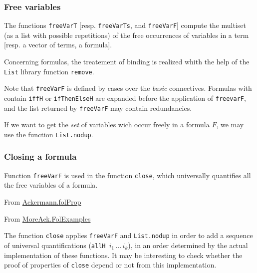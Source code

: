 \subsubsection{Free variables}
The functions \texttt{freeVarT} [resp. \texttt{freeVarTs},  and
\texttt{freeVarF}] compute the multiset (as a list with possible repetitions) of the free occurrences of variables in a term [resp. a vector of terms, a formula].


Concerning formulas, the treatement of binding is realized 
whith the help of the \texttt{List} library function \texttt{remove}.


\begin{remark}
  Note that \texttt{freeVarF} is defined by cases over the \emph{basic} connectives. Formulas with contain \texttt{iffH} or
\texttt{ifThenElseH} are expanded before the application of
\texttt{freevarF}, and the 
list returned by \texttt{freeVarF} may contain redundancies.

If we want to get the \emph{set} of variables wich occur freely 
in a formula $F$, we may use the function \texttt{List.nodup}.



\end{remark}

\subsubsection{Closing a formula}
Function \texttt{freeVarF} is used in 
the  function \texttt{close}, which  universally quantifies  all the free variables of a formula.

\noindent From \href{../theories/html/hydras.Ackermann.folProp.html}{Ackermann.folProp}


\noindent From \href{../theories/html/hydras.MoreAck.FolExamples.html}{MoreAck.FolExamples}


\begin{remark}
  The function \texttt{close} applies \texttt{freeVarF} and
  \texttt{List.nodup}  in order to add a sequence of universal
  quantifications (\texttt{allH $i_1\, \dots\, i_k$}), in an order determined by the actual implementation of these functions. It may be interesting to check whether the proof of properties of \texttt{close} depend or not from this implementation.
\end{remark}

